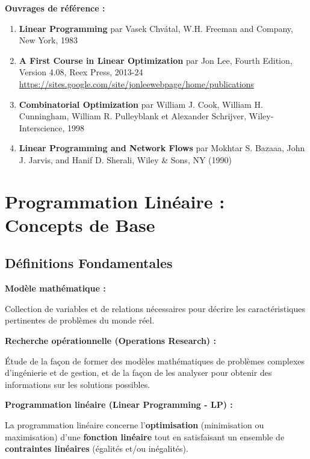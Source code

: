 \documentclass[12pt,a4paper]{article}
\begin{document}
\begin{astuce}
\textbf{Ouvrages de référence :}
\begin{enumerate}
    \item \textbf{Linear Programming} par Vasek Chvátal, W.H. Freeman and Company, New York, 1983
    \item \textbf{A First Course in Linear Optimization} par Jon Lee, Fourth Edition, Version 4.08, Reex Press, 2013-24\\
    \url{https://sites.google.com/site/jonleewebpage/home/publications}
    \item \textbf{Combinatorial Optimization} par William J. Cook, William H. Cunningham, William R. Pulleyblank et Alexander Schrijver, Wiley-Interscience, 1998
    \item \textbf{Linear Programming and Network Flows} par Mokhtar S. Bazaaa, John J. Jarvis, and Hanif D. Sherali, Wiley \& Sons, NY (1990)
\end{enumerate}
\end{astuce}

\newpage
\section{Programmation Linéaire : Concepts de Base}

\subsection{Définitions Fondamentales}

\begin{definition}
\textbf{Modèle mathématique :}

Collection de variables et de relations nécessaires pour décrire les caractéristiques pertinentes de problèmes du monde réel.
\end{definition}

\begin{definition}
\textbf{Recherche opérationnelle (Operations Research) :}

Étude de la façon de former des modèles mathématiques de problèmes complexes d'ingénierie et de gestion, et de la façon de les analyser pour obtenir des informations sur les solutions possibles.
\end{definition}

\begin{definition}
\textbf{Programmation linéaire (Linear Programming - LP) :}

La programmation linéaire concerne l'\textcolor{importantrouge}{\textbf{optimisation}} (minimisation ou maximisation) d'une \textcolor{defvert}{\textbf{fonction linéaire}} tout en satisfaisant un ensemble de \textcolor{algoviolet}{\textbf{contraintes linéaires}} (égalités et/ou inégalités).
\end{definition}
\end{document}
